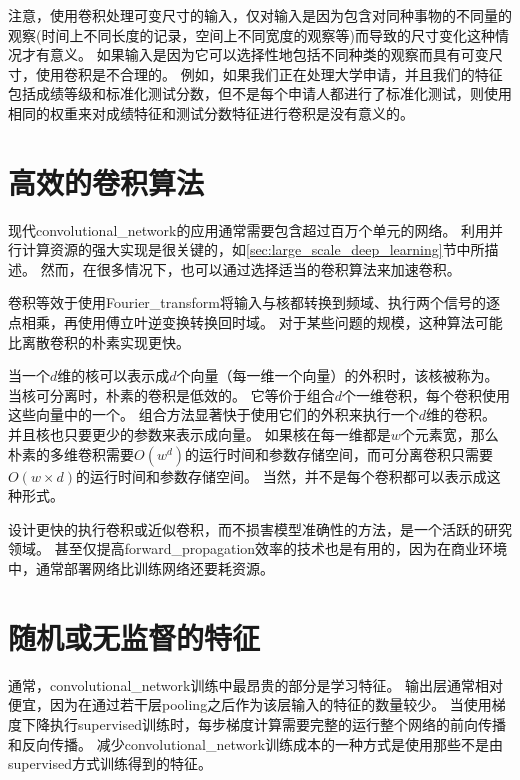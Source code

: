 注意，使用卷积处理可变尺寸的输入，仅对输入是因为包含对同种事物的不同量的观察(时间上不同长度的记录，空间上不同宽度的观察等)而导致的尺寸变化这种情况才有意义。
如果输入是因为它可以选择性地包括不同种类的观察而具有可变尺寸，使用卷积是不合理的。
例如，如果我们正在处理大学申请，并且我们的特征包括成绩等级和标准化测试分数，但不是每个申请人都进行了标准化测试，则使用相同的权重来对成绩特征和测试分数特征进行卷积是没有意义的。

\section{高效的卷积算法}
\label{sec:efficient_convolution_algorithms}

现代\gls{convolutional_network}的应用通常需要包含超过百万个单元的网络。
利用并行计算资源的强大实现是很关键的，如\ref{sec:large_scale_deep_learning}节中所描述。
然而，在很多情况下，也可以通过选择适当的卷积算法来加速卷积。
 
 
卷积等效于使用\gls{Fourier_transform}将输入与核都转换到频域、执行两个信号的逐点相乘，再使用傅立叶逆变换转换回时域。
对于某些问题的规模，这种算法可能比离散卷积的朴素实现更快。

当一个$d$维的核可以表示成$d$个向量（每一维一个向量）的外积时，该核被称为。
当核可分离时，朴素的卷积是低效的。
它等价于组合$d$个一维卷积，每个卷积使用这些向量中的一个。
组合方法显著快于使用它们的外积来执行一个$d$维的卷积。
并且核也只要更少的参数来表示成向量。
如果核在每一维都是$w$个元素宽，那么朴素的多维卷积需要$O(w^d)$的运行时间和参数存储空间，而可分离卷积只需要$O(w\times d)$的运行时间和参数存储空间。
当然，并不是每个卷积都可以表示成这种形式。

设计更快的执行卷积或近似卷积，而不损害模型准确性的方法，是一个活跃的研究领域。 
甚至仅提高\gls{forward_propagation}效率的技术也是有用的，因为在商业环境中，通常部署网络比训练网络还要耗资源。

\section{随机或无监督的特征}
\label{sec:random_or_unsupervised_features}

通常，\gls{convolutional_network}训练中最昂贵的部分是学习特征。 
输出层通常相对便宜，因为在通过若干层\gls{pooling}之后作为该层输入的特征的数量较少。
当使用梯度下降执行\gls{supervised}训练时，每步梯度计算需要完整的运行整个网络的前向传播和反向传播。
减少\gls{convolutional_network}训练成本的一种方式是使用那些不是由\gls{supervised}方式训练得到的特征。

